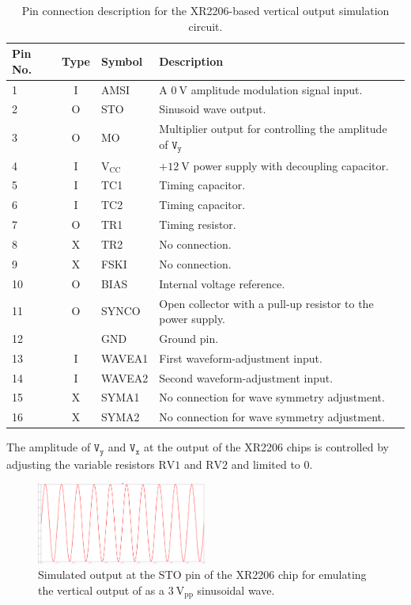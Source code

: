 \documentclass[class=report,11pt,crop=false]{standalone}
\begin{document}
	\begin{table}[ht!]
		\caption{Pin connection description for the XR2206-based vertical output simulation circuit.}
		\label{tab:voec-pin-description}
		\centering
		\begin{tabular}{|m{3em}|c|m{10em}|m{18em}|}
			\hline
			\cellcolor{cyan!25}\textbf{Pin No.} & \cellcolor{cyan!25}\textbf{Type}	& \cellcolor{cyan!25}\textbf{Symbol} & \cellcolor{cyan!25}\textbf{Description} \\
			\hline
			1	&	I	& AMSI 	& A $\SI{0}{\volt}$ amplitude modulation signal input.\\
			\hline
			2	&   O	& STO	&	Sinusoid wave output.\\
			\hline
			3	& 	O	& MO	&	Multiplier output for controlling the amplitude of $\texttt{V}_\texttt{y}$\\
			\hline
			4	& 	I	& $\text{V}_{\text{CC}}$ & $+\SI{12}{\volt}$ power supply with decoupling capacitor.\\
			\hline
			5	& 	I	& TC1	&	Timing capacitor.\\
			\hline
			6	&	I	& TC2	& 	Timing capacitor.\\
			\hline
			7	&	O	& TR1	&	Timing resistor.\\
			\hline
			8	&	X	& TR2	&	 No connection.\\
			\hline
			9	&	X	& FSKI	&	No connection.\\  
			\hline
			10	&	O	& BIAS	&	 Internal voltage reference.\\
			\hline
			11	&	O	& SYNCO	&	 Open collector with a pull-up resistor to the power
			supply.\\
			\hline
			12	& 		& GND		& Ground pin.\\
			\hline
			13	&	I	& WAVEA1	&	 First waveform-adjustment input.\\
			\hline
			14	&	I	& WAVEA2	&	Second waveform-adjustment input.\\
			\hline
			15	&	X	& SYMA1		&	 No connection for wave symmetry adjustment.\\
			\hline
			16	&	X	& SYMA2		&	 No connection for wave symmetry adjustment.\\
			\hline
		\end{tabular}
	\end{table}
	The amplitude of $\texttt{V}_\texttt{y}$ and $\texttt{V}_\texttt{x}$ at the output of the XR2206 chips is controlled by adjusting the variable resistors $\text{RV1}$ and $\text{RV2}$ and limited to $0$.
	\begin{figure}[ht!]
		\centering
		\includegraphics[width=0.50\textwidth]{Figures/Methodology/emulator-vertical-output-sinewave}
		\caption{Simulated output at the STO pin of the XR2206 chip for emulating the vertical output of as a $3~\text{V}_\text{pp}$ sinusoidal wave.}
		\label{fig:emulator-vertical-output-sinewave}
	\end{figure}
\end{document}
